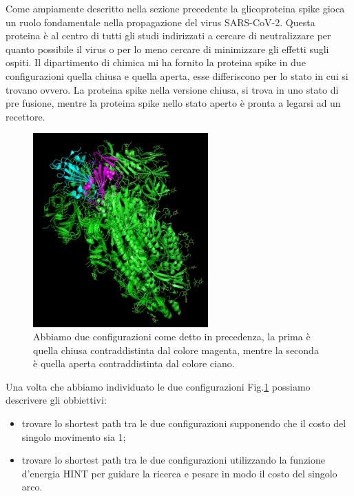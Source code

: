 Come ampiamente descritto nella sezione precedente la glicoproteina spike gioca un ruolo fondamentale nella propagazione del virus SARS-CoV-2. Questa proteina è al centro di tutti gli studi indirizzati a cercare di neutralizzare per quanto possibile il virus o per lo meno cercare di minimizzare gli effetti sugli ospiti.
Il dipartimento di chimica mi ha fornito la proteina spike in due configurazioni quella chiusa e quella aperta, esse differiscono per lo stato in cui si trovano ovvero. La proteina spike nella versione chiusa, si trova in uno stato di pre fusione, mentre la proteina spike nello stato aperto è pronta a legarsi ad un recettore.
\begin{figure}
	\centering
	\includegraphics[width=0.6\textwidth]{Immagini/Struttura_aperta_chiusa.png}
	\caption{Abbiamo due configurazioni come detto in precedenza, la prima è quella chiusa contraddistinta dal colore magenta, mentre la seconda è quella aperta contraddistinta dal colore ciano.}
	\label{fig:Configurazioni}
\end{figure}
Una volta che abbiamo individuato le due configurazioni Fig.\ref{fig:Configurazioni} possiamo descrivere gli obbiettivi:
\vspace{10pt}
\begin{itemize}
	\item trovare lo shortest path tra le due configurazioni supponendo che il costo del singolo movimento sia 1;
	\vspace{5pt}
	\item trovare lo shortest path tra le due configurazioni utilizzando la funzione d'energia HINT per guidare la ricerca e pesare in modo il costo del singolo arco.
\end{itemize}

